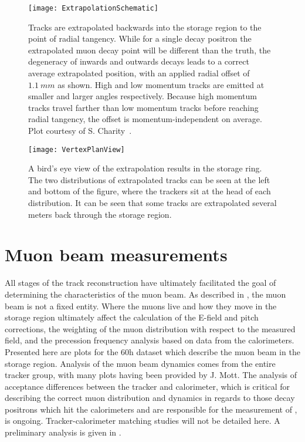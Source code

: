 \begin{figure}
    \centering
    \texttt{[image: ExtrapolationSchematic]}
    \caption[Track extrapolation schematic]{Tracks are extrapolated backwards into the storage region to the point of radial tangency. While for a single decay positron the extrapolated muon decay point will be different than the truth, the degeneracy of inwards and outwards decays leads to a correct average extrapolated position, with an applied radial offset of $\SI{1.1}{mm}$ as shown. High and low momentum tracks are emitted at smaller and larger angles respectively. Because high momentum tracks travel farther than low momentum tracks before reaching radial tangency, the offset is momentum-independent on average. Plot courtesy of S. Charity~\cite{SCThesis}.}    
    \label{fig:ExtrapolationSchematic}
\end{figure}

\begin{figure}
    \centering
    \texttt{[image: VertexPlanView]}
    \caption[Bird's eye view of extrapolation in ring]{A bird's eye view of the extrapolation results in the storage ring. The two distributions of extrapolated tracks can be seen at the left and bottom of the figure, where the trackers sit at the head of each distribution. It can be seen that some tracks are extrapolated several meters back through the storage region.}    
    \label{fig:VertexPlanView}
\end{figure}



\section{Muon beam measurements}
\label{sec:MuonBeamMeasurements}

All stages of the track reconstruction have ultimately facilitated the goal of determining the characteristics of the muon beam. As described in , the muon beam is not a fixed entity. Where the muons live and how they move in the storage region ultimately affect the calculation of the E-field and pitch corrections, the weighting of the muon distribution with respect to the measured field, and the precession frequency analysis based on data from the calorimeters. Presented here are plots for the 60h dataset which describe the muon beam in the storage region. Analysis of the muon beam dynamics comes from the entire tracker group, with many plots having been provided by J. Mott. The analysis of acceptance differences between the tracker and calorimeter, which is critical for describing the correct muon distribution and dynamics in regards to those decay positrons which hit the calorimeters and are responsible for the measurement of \wa, is ongoing. Tracker-calorimeter matching studies will not be detailed here. A preliminary analysis is given in . 

